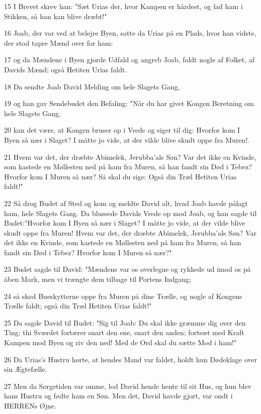 \par 15 I Brevet skrev han: "Sæt Urias der, hvor Kampen er hårdest, og lad ham i Stikken, så han kan blive dræbt!"
\par 16 Joab, der var ved at belejre Byen, satte da Urias på en Plads, hvor han vidste, der stod tapre Mænd over for ham:
\par 17 og da Mændene i Byen gjorde Udfald og angreb Joab, faldt nogle af Folket, af Davids Mænd; også Hetiten Urias faldt.
\par 18 Da sendte Joab David Melding om hele Slagets Gang,
\par 19 og han gav Sendebudet den Befaling: "Når du har givet Kongen Beretning om hele Slagets Gang,
\par 20 kan det være, at Kongen bruser op i Vrede og siger til dig: Hvorfor kom I Byen så nær i Slaget? I måtte jo vide, at der vilde blive skudt oppe fra Muren!.
\par 21 Hvem var det, der dræbte Abimelek, Jerubba'als Søn? Var det ikke en Kvinde, som kastede en Møllesten ned på ham fra Muren, så han fandt sin Død i Tebez? Hvorfor kom I Muren så nær? Så skal du sige: Også din Træl Hetiten Urias faldt!"
\par 22 Så drog Budet af Sted og kom og meldte David alt, hvad Joab havde pålagt ham, hele Slagets Gang. Da blussede Davids Vrede op mod Joab, og han sagde til Budet:"Hvorfor kom I Byen så nær i Slaget? I måtte jo vide, at der vilde blive skudt oppe fra Muren! Hvem var det, der dræbte Abimelek, Jerubba'als Søn? Var det ikke en Kvinde, som kastede en Møllesten ned på ham fra Muren, så han fandt sin Død i Tebez? Hvorfor kom I Muren så nær?"
\par 23 Budet sagde til David: "Mændene var os overlegne og rykkede ud imod os på åben Mark, men vi trængte dem tilbage til Portens Indgang;
\par 24 så skød Bueskytterne oppe fra Muren på dine Trælle, og nogle af Kongens Trælle faldt; også din Træl Hetiten Urias faldt!"
\par 25 Da sagde David til Budet: "Sig til Joab: Du skal ikke græmme dig over den Ting; thi Sværdet fortærer snart den ene, snart den anden; fortsæt med Kraft Kampen mod Byen og riv den ned! Med de Ord skal du sætte Mod i ham!"
\par 26 Da Urias's Hustru hørte, at hendes Mand var faldet, holdt hun Dødeklage over sin Ægtefælle.
\par 27 Men da Sørgetiden var omme, lod David hende hente til sit Hus, og hun blev hans Hustru og fødte ham en Søn. Men det, David havde gjort, var ondt i HERRENs Øjne.

